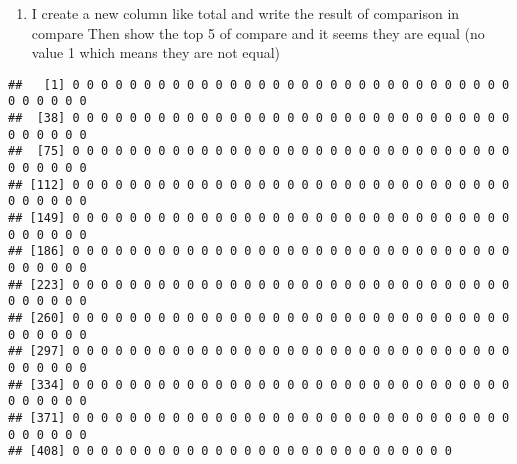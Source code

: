 \documentclass[]{article}
\newenvironment{Shaded}{\begin{snugshade}}{\end{snugshade}}
\newcommand{\DataTypeTok}[1]{\textcolor[rgb]{0.13,0.29,0.53}{#1}}
\newcommand{\DecValTok}[1]{\textcolor[rgb]{0.00,0.00,0.81}{#1}}
\newcommand{\KeywordTok}[1]{\textcolor[rgb]{0.13,0.29,0.53}{\textbf{#1}}}
\newcommand{\NormalTok}[1]{#1}
\newcommand{\OperatorTok}[1]{\textcolor[rgb]{0.81,0.36,0.00}{\textbf{#1}}}
\newcommand{\StringTok}[1]{\textcolor[rgb]{0.31,0.60,0.02}{#1}}
\providecommand{\tightlist}{%
  \setlength{\itemsep}{0pt}\setlength{\parskip}{0pt}}
\begin{document}
\begin{enumerate}
\def\labelenumi{\arabic{enumi}.}
\setcounter{enumi}{3}
\tightlist
\item
  I create a new column like total and write the result of comparison in
  compare Then show the top 5 of compare and it seems they are equal (no
  value 1 which means they are not equal)
\end{enumerate}

\begin{Shaded}
\end{Shaded}

\begin{verbatim}
##   [1] 0 0 0 0 0 0 0 0 0 0 0 0 0 0 0 0 0 0 0 0 0 0 0 0 0 0 0 0 0 0 0 0 0 0 0 0 0
##  [38] 0 0 0 0 0 0 0 0 0 0 0 0 0 0 0 0 0 0 0 0 0 0 0 0 0 0 0 0 0 0 0 0 0 0 0 0 0
##  [75] 0 0 0 0 0 0 0 0 0 0 0 0 0 0 0 0 0 0 0 0 0 0 0 0 0 0 0 0 0 0 0 0 0 0 0 0 0
## [112] 0 0 0 0 0 0 0 0 0 0 0 0 0 0 0 0 0 0 0 0 0 0 0 0 0 0 0 0 0 0 0 0 0 0 0 0 0
## [149] 0 0 0 0 0 0 0 0 0 0 0 0 0 0 0 0 0 0 0 0 0 0 0 0 0 0 0 0 0 0 0 0 0 0 0 0 0
## [186] 0 0 0 0 0 0 0 0 0 0 0 0 0 0 0 0 0 0 0 0 0 0 0 0 0 0 0 0 0 0 0 0 0 0 0 0 0
## [223] 0 0 0 0 0 0 0 0 0 0 0 0 0 0 0 0 0 0 0 0 0 0 0 0 0 0 0 0 0 0 0 0 0 0 0 0 0
## [260] 0 0 0 0 0 0 0 0 0 0 0 0 0 0 0 0 0 0 0 0 0 0 0 0 0 0 0 0 0 0 0 0 0 0 0 0 0
## [297] 0 0 0 0 0 0 0 0 0 0 0 0 0 0 0 0 0 0 0 0 0 0 0 0 0 0 0 0 0 0 0 0 0 0 0 0 0
## [334] 0 0 0 0 0 0 0 0 0 0 0 0 0 0 0 0 0 0 0 0 0 0 0 0 0 0 0 0 0 0 0 0 0 0 0 0 0
## [371] 0 0 0 0 0 0 0 0 0 0 0 0 0 0 0 0 0 0 0 0 0 0 0 0 0 0 0 0 0 0 0 0 0 0 0 0 0
## [408] 0 0 0 0 0 0 0 0 0 0 0 0 0 0 0 0 0 0 0 0 0 0 0 0 0 0 0
\end{verbatim}
\end{document}
